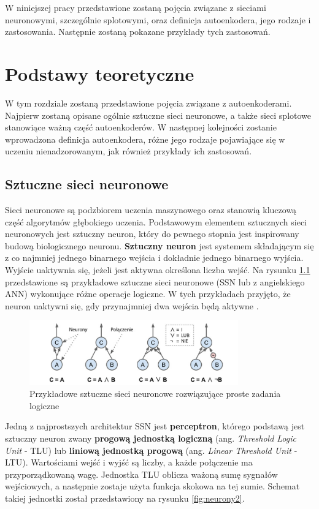 \documentclass[12pt]{mwbk}
\theoremstyle{plain}
\theoremstyle{definition}
\theoremstyle{remark}
\newcommand\zrodlo[1]{\par\vspace{-3mm}{\small\textit{Źródło: }#1 }}
\begin{document}
W niniejszej pracy przedstawione zostaną pojęcia związane z sieciami neuronowymi, szczególnie splotowymi, oraz definicja autoenkodera, jego rodzaje i zastosowania. Następnie zostaną pokazane przykłady tych zastosowań.

\chapter{Podstawy teoretyczne}

W tym rozdziale zostaną przedstawione pojęcia związane z autoenkoderami. Najpierw zostaną opisane ogólnie sztuczne sieci neuronowe, a także sieci splotowe stanowiące ważną część autoenkoderów. W następnej kolejności zostanie wprowadzona definicja autoenkodera, różne jego rodzaje pojawiające się w uczeniu nienadzorowanym, jak również przykłady ich zastosowań.

\section{Sztuczne sieci neuronowe}

Sieci neuronowe są podzbiorem uczenia maszynowego oraz stanowią kluczową część algorytmów głębokiego uczenia. Podstawowym elementem sztucznych sieci neuronowych jest sztuczny neuron, który do pewnego stopnia jest inspirowany budową biologicznego neuronu. \textbf{Sztuczny neuron} jest systemem składającym się z co najmniej jednego binarnego wejścia i dokładnie jednego binarnego wyjścia. Wyjście uaktywnia się, jeżeli jest aktywna określona liczba wejść. Na rysunku \ref{fig:neurony1} przedstawione są przykładowe sztuczne sieci neuronowe (SSN lub z angielskiego ANN) wykonujące różne operacje logiczne. W tych przykładach przyjęto, że neuron uaktywni się, gdy przynajmniej dwa wejścia będą aktywne \cite{geron}.

\begin{figure}[!h]
	\centering
	\includegraphics[width=9cm]{rys/neurony1.png}
	\caption{Przykładowe sztuczne sieci neuronowe rozwiązujące proste zadania logiczne}
	\zrodlo{\cite{geron}}
	\label{fig:neurony1}
\end{figure}

Jedną z najprostszych architektur SSN jest \textbf{perceptron}, którego podstawą jest sztuczny neuron zwany \textbf{progową jednostką logiczną} (ang. \textit{Threshold Logic Unit} - TLU) lub \textbf{liniową jednostką progową} (ang. \textit{Linear Threshold Unit} - LTU). Wartościami wejść i wyjść są liczby, a każde połączenie ma przyporządkowaną wagę. Jednostka TLU oblicza ważoną sumę sygnałów wejściowych, a następnie zostaje użyta funkcja skokowa na tej sumie. Schemat takiej jednostki został przedstawiony na rysunku \ref{fig:neurony2}.
\end{document}
